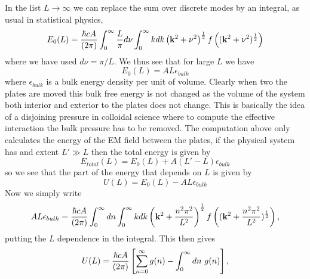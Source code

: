 In the list $L\to\infty$ we can replace the sum over discrete modes by an integral, as usual in statistical physics, 
\begin{equation}
    E_0(L) = {\hbar c A\over (2\pi)}\int_{0}^\infty  {L\over \pi}d\nu \int_0^\infty   kdk \left({\bf k}^2 + \nu^2\right)^{1\over 2}f\left(({\bf k}^2 + \nu^2)^{1\over 2}\right)
\end{equation}
where we have used $d\nu = \pi/L$. We thus see that for large $L$ we have
\begin{equation}
    E_0(L) = AL \epsilon_{bulk}
\end{equation}
where $\epsilon_{bulk}$ is a bulk energy density per unit of volume. Clearly when two the plates are moved this bulk free energy is not changed as the volume of the system both
interior and exterior to the plates does not change. This is basically the idea of a disjoining pressure in colloidal science where to compute the effective interaction the bulk pressure has to be removed. The computation above only calculates the energy of the EM field between the plates, if the physical system has and extent $L'\gg L$ then the total energy is
given by
\begin{equation}
    E_{total}(L) = E_0(L) + A(L'-L)\epsilon_{bulk}
\end{equation}
so we see that the part of the energy that depends on $L$ is given by
\begin{equation}
    U(L) = E_0(L)- AL\epsilon_{bulk}
\end{equation}
Now we simply write 
\begin{equation}
    AL\epsilon_{bulk} = {\hbar c A\over (2\pi)}\int_{0}^\infty  dn \int_0^\infty   kdk \left({\bf k}^2 + {n^2\pi^2\over L^2}\right)^{1\over 2} f\left(({\bf k}^2 + {n^2\pi^2\over L^2})^{1\over 2}\right),
\end{equation}
putting the $L$ dependence in the integral. This then gives
\begin{equation}
    U(L) = {\hbar c A\over (2\pi)}\left[\sum_{n=0}^\infty g(n) -\int_0^\infty dn \ g(n)\right],
\end{equation}
 
